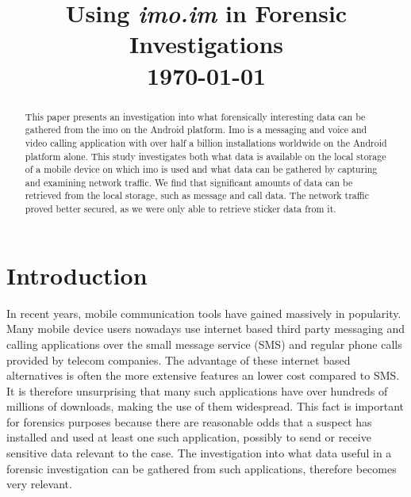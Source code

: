 \documentclass[conference]{IEEEtran}
\begin{document}
\title{Using {\it imo.im} in Forensic Investigations \\\vspace{5mm} \large  \today}
\author{
\and
{}
}
\maketitle
\thispagestyle{plain}
\pagestyle{plain}

\begin{abstract}

    This paper presents an investigation into what forensically interesting data
    can be gathered from the imo on the Android platform. Imo is a messaging and
    voice and video calling application with over half a billion installations
    worldwide on the Android platform alone. This study investigates both what
    data is available on the local storage of a mobile device on which imo is
    used and what data can be gathered by capturing and examining network
    traffic. We find that significant amounts of data can be retrieved from the
    local storage, such as message and call data. The network traffic proved
    better secured, as we were only able to retrieve sticker data from it.

\end{abstract}

\section{Introduction}

In recent years, mobile communication tools have gained massively in popularity.
Many mobile device users nowadays use internet based third party messaging and
calling applications over the small message service (SMS) and regular phone
calls provided by telecom companies.  The advantage of these internet based
alternatives is often the more extensive features an lower cost compared to SMS.
It is therefore unsurprising that many such applications have over hundreds of
millions of downloads, making the use of them widespread. This fact is important
for forensics purposes because there are reasonable odds that a suspect has
installed and used at least one such application, possibly to send or receive
sensitive data relevant to the case. The investigation into what data useful in
a forensic investigation can be gathered from such applications, therefore
becomes very relevant.
\end{document}
